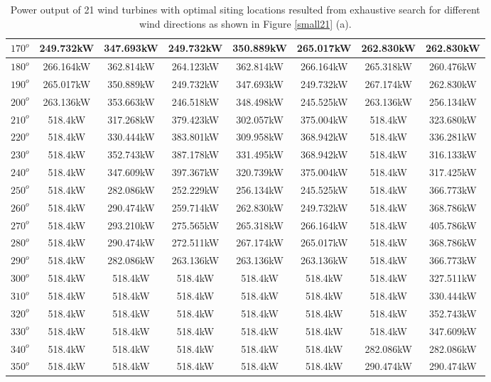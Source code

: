 \begin{table}[H]
\begin{tabular}{|c|c|c|c|c|c|c|c|}
		$170^o$	& 249.732kW	& 347.693kW	& 249.732kW	& 350.889kW	& 265.017kW	& 262.830kW	& 262.830kW	\\ \hline
		$180^o$	& 266.164kW	& 362.814kW	& 264.123kW	& 362.814kW	& 266.164kW	& 265.318kW	& 260.476kW	\\ \hline
		$190^o$	& 265.017kW	& 350.889kW	& 249.732kW	& 347.693kW	& 249.732kW	& 267.174kW	& 262.830kW	\\ \hline
		$200^o$	& 263.136kW	& 353.663kW	& 246.518kW	& 348.498kW	& 245.525kW	& 263.136kW	& 256.134kW	\\ \hline
		$210^o$	& 518.4kW	& 317.268kW	& 379.423kW	& 302.057kW	& 375.004kW	& 518.4kW	& 323.680kW	\\ \hline
		$220^o$	& 518.4kW	& 330.444kW	& 383.801kW	& 309.958kW	& 368.942kW	& 518.4kW	& 336.281kW	\\ \hline
		$230^o$	& 518.4kW	& 352.743kW	& 387.178kW	& 331.495kW	& 368.942kW	& 518.4kW	& 316.133kW	\\ \hline
		$240^o$	& 518.4kW	& 347.609kW	& 397.367kW	& 320.739kW	& 375.004kW	& 518.4kW	& 317.425kW	\\ \hline
		$250^o$	& 518.4kW	& 282.086kW	& 252.229kW	& 256.134kW	& 245.525kW	& 518.4kW	& 366.773kW	\\ \hline
		$260^o$	& 518.4kW	& 290.474kW	& 259.714kW	& 262.830kW	& 249.732kW	& 518.4kW	& 368.786kW	\\ \hline
		$270^o$	& 518.4kW	& 293.210kW	& 275.565kW	& 265.318kW	& 266.164kW	& 518.4kW	& 405.786kW	\\ \hline
		$280^o$	& 518.4kW	& 290.474kW	& 272.511kW	& 267.174kW	& 265.017kW	& 518.4kW	& 368.786kW	\\ \hline
		$290^o$	& 518.4kW	& 282.086kW	& 263.136kW	& 263.136kW	& 263.136kW	& 518.4kW	& 366.773kW	\\ \hline
		$300^o$	& 518.4kW	& 518.4kW	& 518.4kW	& 518.4kW	& 518.4kW	& 518.4kW	& 327.511kW	\\ \hline
		$310^o$	& 518.4kW	& 518.4kW	& 518.4kW	& 518.4kW	& 518.4kW	& 518.4kW	& 330.444kW	\\ \hline
		$320^o$	& 518.4kW	& 518.4kW	& 518.4kW	& 518.4kW	& 518.4kW	& 518.4kW	& 352.743kW	\\ \hline
		$330^o$	& 518.4kW	& 518.4kW	& 518.4kW	& 518.4kW	& 518.4kW	& 518.4kW	& 347.609kW	\\ \hline
		$340^o$	& 518.4kW	& 518.4kW	& 518.4kW	& 518.4kW	& 518.4kW	& 282.086kW	& 282.086kW	\\ \hline
		$350^o$	& 518.4kW	& 518.4kW	& 518.4kW	& 518.4kW	& 518.4kW	& 290.474kW	& 290.474kW	\\ \hline
        	\end{tabular}
        	\caption{Power output of 21 wind turbines with optimal siting locations resulted from exhaustive search for different wind directions as shown in Figure \ref{small21} (a).}
        	\label{table21a}
        \end{table}
